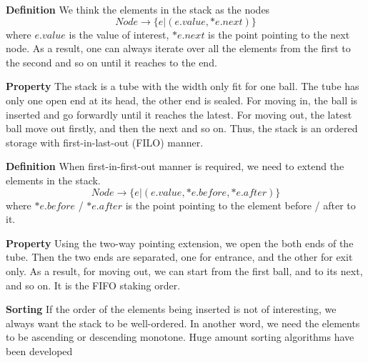 \textbf{Definition}
We think the elements in the stack as the nodes
\begin{equation}
    \label{Eq: Node in stack}
    Node \rightarrow \{e| (e.value, *e.next)\}
\end{equation}
where $e.value$ is the value of interest, $*e.next$ is the point pointing to the next node.
As a result, one can always iterate over all the elements from the first to the second and so on until it reaches to the end.

\textbf{Property}
The stack is a tube with the width only fit for one ball.
The tube has only one open end at its head, the other end is sealed.
For moving in, the ball is inserted and go forwardly until it reaches the latest.
For moving out, the latest ball move out firstly, and then the next and so on.
Thus, the stack is an ordered storage with first-in-last-out (FILO) manner.

\textbf{Definition}
When first-in-first-out manner is required, we need to extend the elements in the stack.
\begin{equation}
    \label{Eq: Node in stack extension}
    Node \rightarrow \{e| (e.value, *e.before, *e.after)\}
\end{equation}
where $*e.before$ / $*e.after$ is the point pointing to the element before / after to it.

\textbf{Property}
Using the two-way pointing extension, we open the both ends of the tube.
Then the two ends are separated, one for entrance, and the other for exit only.
As a result, for moving out, we can start from the first ball, and to its next, and so on.
It is the FIFO staking order.

\textbf{Sorting}
If the order of the elements being inserted is not of interesting, we always want the stack to be well-ordered.
In another word, we need the elements to be ascending or descending monotone.
Huge amount sorting algorithms have been developed

